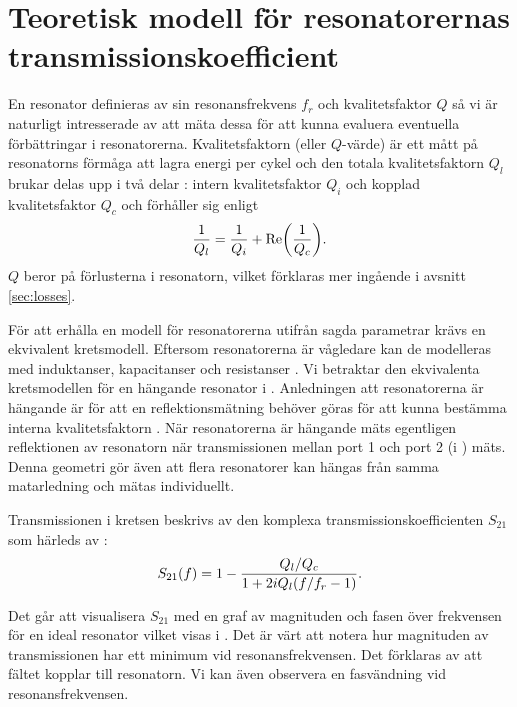 \documentclass[main.tex]{subfiles}
\begin{document}
\newpage
\section{Teoretisk modell för resonatorernas transmissionskoefficient}
\label{sec:res_teori}


En resonator definieras av sin resonansfrekvens $f_r$ och kvalitetsfaktor $Q$ \cite[s. 3]{Boehme2016} så vi är naturligt intresserade av att mäta dessa för att kunna evaluera eventuella förbättringar i resonatorerna. Kvalitetsfaktorn (eller $Q$-värde) är ett mått på resonatorns förmåga att lagra energi per cykel och den totala kvalitetsfaktorn $Q_l$ brukar delas upp i två delar \cite{Probst2015}: intern kvalitetsfaktor $Q_i$ och kopplad kvalitetsfaktor $Q_c$ och förhåller sig enligt 
\begin{equation}
\frac{1}{Q_l}=\frac{1}{Q_i}+\text{Re}\qty(\frac{1}{Q_c}).
\end{equation}
$Q$ beror på förlusterna i resonatorn, vilket förklaras mer ingående i avsnitt \ref{sec:losses}.

För att erhålla en modell för resonatorerna utifrån sagda parametrar krävs en ekvivalent kretsmodell. Eftersom resonatorerna är vågledare kan de modelleras med induktanser, kapacitanser och resistanser \cite[s. 437]{cheng}. Vi betraktar den ekvivalenta kretsmodellen för en hängande resonator \cite{Boehme2016} i . Anledningen att resonatorerna är hängande är för att en reflektionsmätning behöver göras för att kunna bestämma interna kvalitetsfaktorn \cite{Probst2015}. När resonatorerna är hängande mäts egentligen reflektionen av resonatorn när transmissionen mellan port 1 och port 2 (i ) mäts. Denna geometri gör även att flera resonatorer kan hängas från samma matarledning och mätas individuellt.

Transmissionen i kretsen beskrivs av den komplexa transmissionskoefficienten $S_{21}$ som härleds av \citeauthor{Boehme2016} \cite[s. 38]{Boehme2016}:
\begin{equation}
    S_{21}(f)=1-\frac{Q_l/Q_c}{1+2iQ_l\qty(f/f_r-1)}.
\label{eq:S21_ideal}
\end{equation}

Det går att visualisera $S_{21}$ med en graf av magnituden och fasen över frekvensen för en ideal resonator vilket visas i . Det är värt att notera hur magnituden av transmissionen har ett minimum vid resonansfrekvensen. Det förklaras av att fältet kopplar till resonatorn. Vi kan även observera en fasvändning vid resonansfrekvensen.
\end{document}
